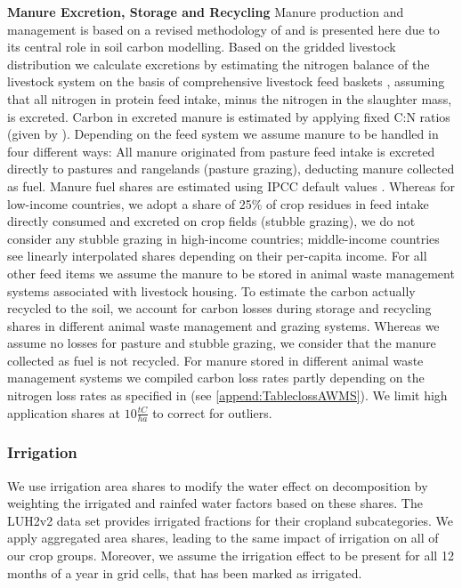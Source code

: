 \documentclass[gc, manuscript]{copernicus}
\begin{document}
\textbf{Manure Excretion, Storage and Recycling}
Manure production and management is based on a revised methodology of \citep{bodirsky_n2o_2012} and is presented here due to its central role in soil carbon modelling. Based on the gridded livestock distribution we calculate excretions by estimating the nitrogen balance of the livestock system on the basis of comprehensive livestock feed baskets \citep{weindl_livestock_2017}, assuming that all nitrogen in protein feed intake, minus the nitrogen in the slaughter mass, is excreted. Carbon in excreted manure is estimated by applying fixed C:N ratios (given by \citep{ipcc_2019_2019}).
Depending on the feed system we assume manure to be handled in four different ways:
All manure originated from pasture feed intake is excreted directly to pastures and rangelands (pasture grazing), deducting manure collected as fuel. Manure fuel shares are estimated using IPCC default values \citep{ipcc_2006_2006}.
Whereas for low-income countries, we adopt a share of 25\% of crop residues in feed intake directly consumed and excreted on crop fields (stubble grazing), we do not consider any stubble grazing in high-income countries; middle-income countries see linearly interpolated shares depending on their per-capita income.
For all other feed items we assume the manure to be stored in animal waste management systems associated with livestock housing.
To estimate the carbon actually recycled to the soil, we account for carbon losses during storage and recycling shares in different animal waste management and grazing systems. Whereas we assume no losses for pasture and stubble grazing, we consider that the manure collected as fuel is not recycled. For manure stored in different animal waste management systems we compiled carbon loss rates partly depending on the nitrogen loss rates as specified in \citep{bodirsky_n2o_2012} (see \ref{append:TableclossAWMS}). We limit high application shares at \(10\tfrac{\unit{tC}}{\unit{ha}}\) to correct for outliers.

\hypertarget{sec:irrigation}{%
\subsubsection{Irrigation}\label{sec:irrigation}}

We use irrigation area shares to modify the water effect on decomposition by weighting the irrigated and rainfed water factors based on these shares. The LUH2v2 \citep{hurtt_harmonization_2020} data set provides irrigated fractions for their cropland subcategories. We apply aggregated area shares, leading to the same impact of irrigation on all of our crop groups. Moreover, we assume the irrigation effect to be present for all 12 months of a year in grid cells, that has been marked as irrigated.
\end{document}
